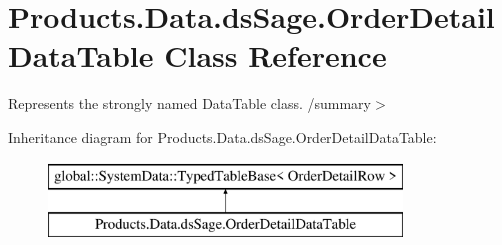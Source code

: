 \hypertarget{class_products_1_1_data_1_1ds_sage_1_1_order_detail_data_table}{}\section{Products.\+Data.\+ds\+Sage.\+Order\+Detail\+Data\+Table Class Reference}
\label{class_products_1_1_data_1_1ds_sage_1_1_order_detail_data_table}


Represents the strongly named Data\+Table class. /summary$>$  


Inheritance diagram for Products.\+Data.\+ds\+Sage.\+Order\+Detail\+Data\+Table\+:\begin{figure}[H]
\begin{center}
\leavevmode
\includegraphics[height=2.000000cm]{class_products_1_1_data_1_1ds_sage_1_1_order_detail_data_table}
\end{center}
\end{figure}
